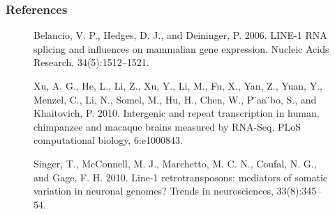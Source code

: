\documentclass{beamer}
\begin{document}
			\begin{frame}
				\frametitle{References}
				
				\begin{figure} 
					\flushleft
				\footnotesize Belancio, V. P., Hedges, D. J., and Deininger, P. 2006. LINE-1 RNA splicing and influences on mammalian gene expression. Nucleic Acids Research, 34(5):1512–1521. \\
				\end{figure}
				
				\begin{figure}
					\flushleft
				\footnotesize Xu, A. G., He, L., Li, Z., Xu, Y., Li, M., Fu, X., Yan, Z., Yuan, Y., Menzel, C., Li, N., Somel, M., Hu, H., Chen, W., P ̈aa ̈bo, S., and Khaitovich, P. 2010. Intergenic and repeat transcription in human, chimpanzee and macaque brains measured by RNA-Seq. PLoS computational biology, 6:e1000843. \\
				\end{figure}
				\begin{figure}	
					\flushleft
				\footnotesize Singer, T., McConnell, M. J., Marchetto, M. C. N., Coufal, N. G., and Gage, F. H. 2010. Line-1 retrotransposons: mediators of somatic variation in neuronal genomes? Trends in neurosciences, 33(8):345–54.
			\end{figure}
			\end{frame}
			
		
\end{document}
